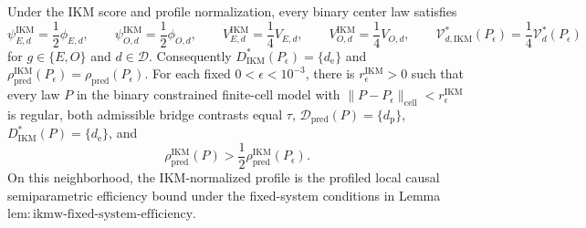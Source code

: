 Under the IKM score and profile normalization, every binary center law satisfies
\[
\psi_{E,d}^{\mathrm{IKM}}=\frac12\phi_{E,d},
\qquad
\psi_{O,d}^{\mathrm{IKM}}=\frac12\phi_{O,d},
\qquad
V_{E,d}^{\mathrm{IKM}}=\frac14V_{E,d},
\qquad
V_{O,d}^{\mathrm{IKM}}=\frac14V_{O,d},
\qquad
\mathcal V_{d,\mathrm{IKM}}^*(P_\epsilon)
=\frac14\mathcal V_d^*(P_\epsilon)
\]
for \(g\in\{E,O\}\) and \(d\in\mathcal D\). Consequently \(D_{\mathrm{IKM}}^*(P_\epsilon)=\{d_{\mathrm e}\}\) and \(\rho_{\mathrm{pred}}^{\mathrm{IKM}}(P_\epsilon)=\rho_{\mathrm{pred}}(P_\epsilon)\). For each fixed \(0<\epsilon<10^{-3}\), there is \(r_\epsilon^{\mathrm{IKM}}>0\) such that every law \(P\) in the binary constrained finite-cell model with \(\|P-P_\epsilon\|_{\mathrm{cell}}<r_\epsilon^{\mathrm{IKM}}\) is regular, both admissible bridge contrasts equal \(\tau\), \(\mathcal D_{\mathrm{pred}}(P)=\{d_{\mathrm p}\}\), \(D_{\mathrm{IKM}}^*(P)=\{d_{\mathrm e}\}\), and
\[
\rho_{\mathrm{pred}}^{\mathrm{IKM}}(P)
>\frac12\rho_{\mathrm{pred}}^{\mathrm{IKM}}(P_\epsilon).
\]
On this neighborhood, the IKM-normalized profile is the profiled local causal semiparametric efficiency bound under the fixed-system conditions in Lemma~\(\mathrm{lem{:}ikmw\text{-}fixed\text{-}system\text{-}efficiency}\).